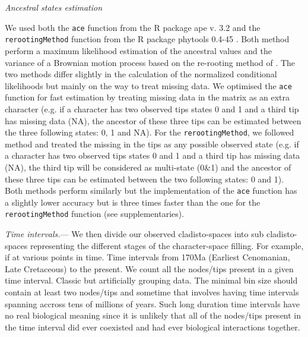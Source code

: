 \documentclass[12pt,letterpaper]{article}
\renewcommand{\subsection}[1]{%
\bigskip
\begin{center}
\begin{large}
\normalfont\itshape #1
\end{large}
\end{center}}
\renewcommand{\subsubsection}[1]{%
\vspace{2ex}
\noindent
\textit{#1.}---}
\begin{document}
\subsection{Ancestral states estimation}
We used both the \texttt{ace} function from the R package ape v. 3.2 \citep{paradisape:2004} and the 
\texttt{rerootingMethod} function from the R package phytools 0.4-45 \citep{phytools}. Both method perform a maximum likelihood estimation of the ancestral values and the variance of a Brownian motion process based on the re-rooting method of \citep{Yang01121995}. The two methods differ slightly in the calculation of the normalized conditional likelihoods but mainly on the way to treat missing data. We optimised the \texttt{ace} function for fast estimation by treating missing data in the matrix as an extra character (e.g. if a character has two observed tips states 0 and 1 and a third tip has missing data (NA), the ancestor of these three tips can be estimated between the three following states: 0, 1 and NA). For the \texttt{rerootingMethod}, we followed \citep{Claddis} method and treated the missing in the tips as any possible observed state (e.g. if a character has two observed tips states 0 and 1 and a third tip has missing data (NA), the third tip will be considered as multi-state (0\&1) and the ancestor of these three tips can be estimated between the two following states: 0 and 1). Both methods perform similarly but the implementation of the \texttt{ace} function has a slightly lower accuracy  but is three times faster than the one for the \texttt{rerootingMethod} function (see supplementaries).

\subsubsection{Time intervals}
We then divide our observed cladisto-spaces into sub cladisto-spaces representing the different stages of the character-space filling. For example, if at various points in time.
Time intervals from 170Ma (Earliest Cenomanian, Late Cretaceous) to the present.
We count all the nodes/tips present in a given time interval.
Classic but artificially grouping data. The minimal bin size should contain at least two nodes/tips and sometime that involves having time intervals spanning accross tens of millions of years. Such long duration time intervals have no real biological meaning since it is unlikely that all of the nodes/tips present in the time interval did ever coexisted and had ever biological interactions together.
\end{document}
